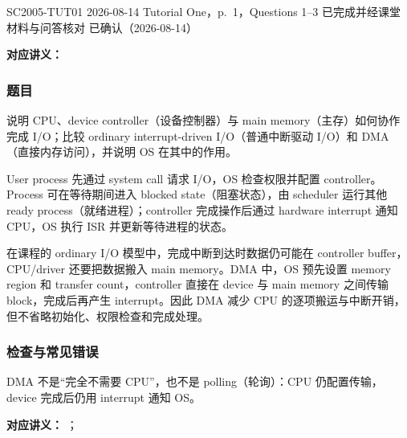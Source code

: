 
\label{tutorial:SC2005-TUT01}

\tutorialmeta
  {SC2005-TUT01}
  {2026-08-14}
  {Tutorial One，p.~1，Questions 1--3}
  {已完成并经课堂材料与问答核对}
  {已确认（2026-08-14）}


\textbf{对应讲义：}

\subsubsection*{题目}

说明 CPU、device controller（设备控制器）与 main memory（主存）如何协作完成 I/O；比较 ordinary interrupt-driven I/O（普通中断驱动 I/O）和 DMA（直接内存访问），并说明 OS 在其中的作用。

\begin{checkedsolution}
User process 先通过 system call 请求 I/O，OS 检查权限并配置 controller。Process 可在等待期间进入 blocked state（阻塞状态），由 scheduler 运行其他 ready process（就绪进程）；controller 完成操作后通过 hardware interrupt 通知 CPU，OS 执行 ISR 并更新等待进程的状态。

在课程的 ordinary I/O 模型中，完成中断到达时数据仍可能在 controller buffer，CPU/driver 还要把数据搬入 main memory。DMA 中，OS 预先设置 memory region 和 transfer count，controller 直接在 device 与 main memory 之间传输 block，完成后再产生 interrupt。因此 DMA 减少 CPU 的逐项搬运与中断开销，但不省略初始化、权限检查和完成处理。
\end{checkedsolution}

\subsubsection*{检查与常见错误}

DMA 不是“完全不需要 CPU”，也不是 polling（轮询）：CPU 仍配置传输，device 完成后仍用 interrupt 通知 OS。


\textbf{对应讲义：}
；

